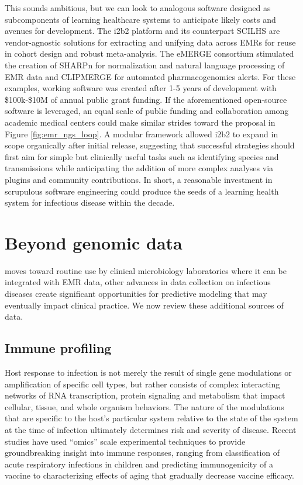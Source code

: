This sounds ambitious, but we can look to analogous software designed as subcomponents of learning healthcare systems to anticipate likely costs and avenues for development. The i2b2 platform\autocite{Kohane2012} and its counterpart SCILHS\autocite{Mandl2014} are vendor-agnostic solutions for extracting and unifying data across EMRs for reuse in cohort design and robust meta-analysis. The eMERGE consortium stimulated the creation of SHARPn for normalization and natural language processing of EMR data\autocite{Rea2012} and CLIPMERGE for automated pharmacogenomics alerts.\autocite{Gottesman2013} For these examples, working software was created after 1-5 years of development with \$100k-\$10M of annual public grant funding.\autocite{Gottesman2013,Kohane2012,Mandl2014,Rea2012} If the aforementioned open-source software is leveraged, an equal scale of public funding and collaboration among academic medical centers could make similar strides toward the proposal in Figure \ref{fig:emr_ngs_loop}. A modular framework allowed i2b2 to expand in scope organically after initial release,\autocite{Kohane2012,Mandl2014} suggesting that successful strategies should first aim for simple but clinically useful tasks such as identifying species and transmissions while anticipating the addition of more complex analyses via plugins and community contributions. In short, a reasonable investment in scrupulous software engineering could produce the seeds of a learning health system for infectious disease within the decade.

\section{Beyond genomic data}

 moves toward routine use by clinical microbiology laboratories where it can be integrated with EMR data, other advances in data collection on infectious diseases create significant opportunities for predictive modeling that may eventually impact clinical practice. We now review these additional sources of data.

\subsection{Immune profiling}

Host response to infection is not merely the result of single gene modulations or amplification of specific cell types, but rather consists of complex interacting networks of RNA transcription, protein signaling and metabolism that impact cellular, tissue, and whole organism behaviors. The nature of the modulations that are specific to the host’s particular system relative to the state of the system at the time of infection ultimately determines risk and severity of disease. Recent studies have used “omics” scale experimental techniques to provide groundbreaking insight into immune responses, ranging from classification of acute respiratory infections in children\autocite{Mejias2014} and predicting immunogenicity of a vaccine\autocite{Querec2009,Furman2013} to characterizing effects of aging that gradually decrease vaccine efficacy.\autocite{Poland2014}

